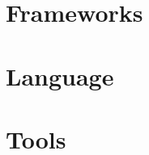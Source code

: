 \documentclass[a4paper,10pt,twoside]{book}
\begin{document}
\part{Frameworks}




\newcommand{\fig}[4]{
		\begin{figure}[#1]
			\centering
			\texttt{[image: \#3]}
			\caption{\label{fig:#3}#4}
		\end{figure}}

	\newcommand{\largefig}[4]{
		\begin{figure*}[#1]
			\centering
			\texttt{[image: \#3]}
			\caption{\label{fig:#3}#4}
		\end{figure*}}
		
	\newcommand{\asdf}[4]{
		\begin{subfigure}[\label{fig:#3}]
                \centering
                \texttt{[image: \#3]}
                \caption{\label{fig:#3}#4}                
        \end{subfigure}}





\part{Language}






\part{Tools}












\printindex
\end{document}
